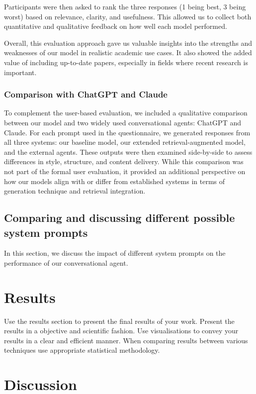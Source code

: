 \documentclass[fleqn,moreauthors,10pt]{ds_report}
\begin{document}
Participants were then asked to rank the three responses (1 being best, 3 being worst) based on relevance, clarity, and usefulness. This allowed us to collect both quantitative and qualitative feedback on how well each model performed.

Overall, this evaluation approach gave us valuable insights into the strengths and weaknesses of our model in realistic academic use cases. It also showed the added value of including up-to-date papers, especially in fields where recent research is important.

\subsubsection*{Comparison with ChatGPT and Claude}

To complement the user-based evaluation, we included a qualitative comparison between our model and two widely used conversational agents: ChatGPT and Claude. For each prompt used in the questionnaire, we generated responses from all three systems: our baseline model, our extended retrieval-augmented model, and the external agents. These outputs were then examined side-by-side to assess differences in style, structure, and content delivery. While this comparison was not part of the formal user evaluation, it provided an additional perspective on how our models align with or differ from established systems in terms of generation technique and retrieval integration.


\subsection*{Comparing and discussing different possible system prompts}
In this section, we discuss the impact of different system prompts on the performance of our conversational agent.


\section*{Results}

Use the results section to present the final results of your work. Present the results in a objective and scientific fashion. Use visualisations to convey your results in a clear and efficient manner. When comparing results between various techniques use appropriate statistical methodology.


\section*{Discussion}
\end{document}
